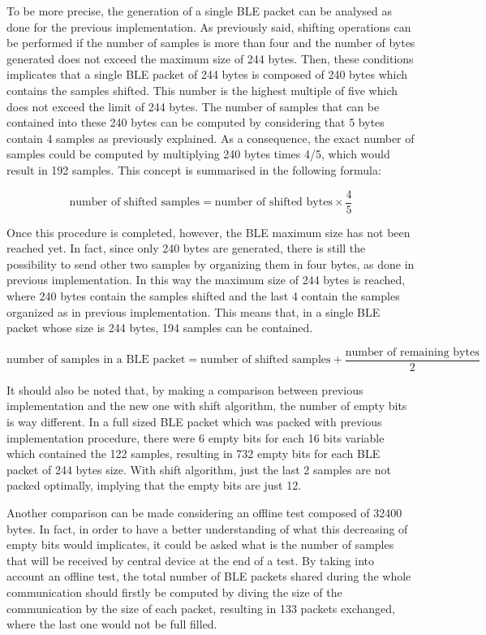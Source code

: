 \documentclass{Configuration_Files/PoliMi3i_thesis}
\begin{document}
To be more precise, the generation of a single BLE packet can be analysed as done for the previous implementation. As previously said, shifting operations can be performed if the number of samples is more than four and the number of bytes generated does not exceed the maximum size of 244 bytes. Then, these conditions implicates that a single BLE packet of 244 bytes is composed of 240 bytes which contains the samples shifted. This number is the highest multiple of five which does not exceed the limit of 244 bytes. The number of samples that can be contained into these 240 bytes can be computed by considering that 5 bytes contain 4 samples as previously explained. As a consequence, the exact number of samples could be computed by multiplying 240 bytes times 4/5, which would result in 192 samples. This concept is summarised in the following formula:

\[
\text{number of shifted samples} = \text{number of shifted bytes} \times \frac{4}{5}
\]

Once this procedure is completed, however, the BLE maximum size has not been reached yet. In fact, since only 240 bytes are generated, there is still the possibility to send other two samples by organizing them in four bytes, as done in previous implementation. In this way the maximum size of 244 bytes is reached, where 240 bytes contain the samples shifted and the last 4 contain the samples organized as in previous implementation. This means that, in a single BLE packet whose size is 244 bytes, 194 samples can be contained.

\[
\text{number of samples in a BLE packet} = \text{number of shifted samples} + \frac{\text{number of remaining bytes}}{2}
\]

It should also be noted that, by making a comparison between previous implementation and the new one with shift algorithm, the number of empty bits is way different. In a full sized BLE packet which was packed with previous implementation procedure, there were 6 empty bits for each 16 bits variable which contained the 122 samples, resulting in 732 empty bits for each BLE packet of 244 bytes size. With shift algorithm, just the last 2 samples are not packed optimally, implying that the empty bits are just 12.

Another comparison can be made considering an offline test composed of 32400 bytes. In fact, in order to have a better understanding of what this decreasing of empty bits would implicates, it could be asked what is the number of samples that will be received by central device at the end of a test. By taking into account an offline test, the total number of BLE packets shared during the whole communication should firstly be computed by diving the size of the communication by the size of each packet, resulting in 133 packets exchanged, where the last one would not be full filled.
\end{document}
